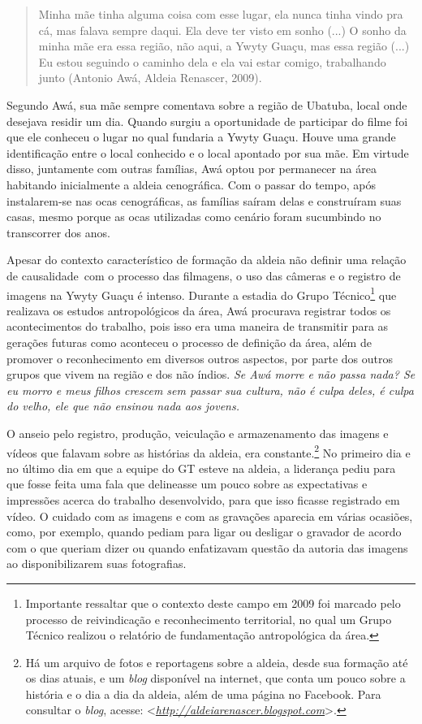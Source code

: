 \begin{quote}
Minha mãe tinha alguma coisa com esse lugar, ela nunca tinha vindo pra
cá, mas falava sempre daqui. Ela deve ter visto em sonho (...) O sonho
da minha mãe era essa região, não aqui, a Ywyty Guaçu, mas essa região
(...) Eu estou seguindo o caminho dela e ela vai estar comigo,
trabalhando junto (Antonio Awá, Aldeia Renascer, 2009).
\end{quote}

Segundo Awá, sua mãe sempre comentava sobre a região de Ubatuba, local
onde desejava residir um dia. Quando surgiu a oportunidade de participar
do filme foi que ele conheceu o lugar no qual fundaria a Ywyty Guaçu.
Houve uma grande identificação entre o local conhecido e o local
apontado por sua mãe. Em virtude disso, juntamente com outras famílias,
Awá optou por permanecer na área habitando inicialmente a aldeia
cenográfica. Com o passar do tempo, após instalarem-se nas ocas
cenográficas, as famílias saíram delas e construíram suas casas, mesmo
porque as ocas utilizadas como cenário foram sucumbindo no transcorrer
dos anos.

Apesar do contexto característico de formação da aldeia não definir uma
relação de causalidade~com o processo das filmagens, o uso das câmeras e
o registro de imagens na Ywyty Guaçu é intenso. Durante a estadia do
Grupo Técnico\footnote{Importante ressaltar que o contexto deste campo
  em 2009 foi marcado pelo processo de reivindicação e reconhecimento
  territorial, no qual um Grupo Técnico realizou o relatório de
  fundamentação antropológica da área.} que realizava os estudos
antropológicos da área, Awá procurava registrar todos os acontecimentos
do trabalho, pois isso era uma maneira de transmitir para as gerações
futuras como aconteceu o processo de definição da área, além de promover
o reconhecimento em diversos outros aspectos, por parte dos outros
grupos que vivem na região e dos não índios. \emph{Se Awá morre e não
passa nada? Se eu morro e meus filhos crescem sem passar sua cultura,
não é culpa deles, é culpa do velho, ele que não ensinou nada aos
jovens.}

O anseio pelo registro, produção, veiculação e armazenamento das imagens
e vídeos que falavam sobre as histórias da aldeia, era
constante.\footnote{Há um arquivo de fotos e reportagens sobre a aldeia,
  desde sua formação até os dias atuais, e um \emph{blog} disponível na
  internet, que conta um pouco sobre a história e o dia a dia da aldeia,
  além de uma página no Facebook. Para consultar o \emph{blog}, acesse:
  \textless{}\href{http://aldeiarenascer.blogspot.com/}{\emph{http://aldeiarenascer.blogspot.com}}\textgreater{}.}
No primeiro dia e no último dia em que a equipe do GT esteve na aldeia,
a liderança pediu para que fosse feita uma fala que delineasse um pouco
sobre as expectativas e impressões acerca do trabalho desenvolvido, para
que isso ficasse registrado em vídeo. O cuidado com as imagens e com as
gravações aparecia em várias ocasiões, como, por exemplo, quando pediam
para ligar ou desligar o gravador de acordo com o que queriam dizer ou
quando enfatizavam questão da autoria das imagens ao disponibilizarem
suas fotografias.

